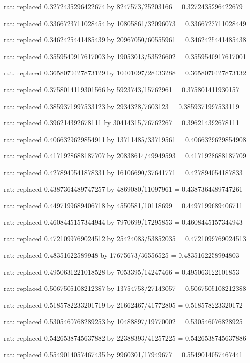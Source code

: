 \documentclass[a4paper,10pt]{article}
\begin{document}
\begin{eulernotebook}
\begin{eulercomment}
\begin{eulercomment}
\begin{eulercomment}
\begin{eulercomment}
\begin{eulercomment}
\begin{eulercomment}
\begin{eulercomment}
\begin{eulercomment}
\begin{eulercomment}
\begin{eulercomment}
\begin{eulercomment}
\begin{eulercomment}
\begin{eulercomment}
\begin{eulercomment}
\begin{eulercomment}
\begin{eulercomment}
\begin{euleroutput}
  rat: replaced 0.3272435296422674 by 8247573/25203166 = 0.3272435296422679
  
  rat: replaced 0.3366723711028454 by 10805861/32096073 = 0.3366723711028449
  
  rat: replaced 0.3462425441485439 by 20967050/60555961 = 0.3462425441485438
  
  rat: replaced 0.3559540917617003 by 19053013/53526602 = 0.3559540917617001
  
  rat: replaced 0.3658070427873129 by 10401097/28433288 = 0.3658070427873132
  
  rat: replaced 0.3758014119301566 by 5923743/15762961 = 0.375801411930157
  
  rat: replaced 0.3859371997533123 by 2934328/7603123 = 0.3859371997533119
  
  rat: replaced 0.396214392678111 by 30414315/76762267 = 0.396214392678111
  
  rat: replaced 0.4066329629854911 by 13711485/33719561 = 0.4066329629854908
  
  rat: replaced 0.4171928688187707 by 20838614/49949593 = 0.4171928688187709
  
  rat: replaced 0.4278940541878331 by 16106690/37641771 = 0.427894054187833
  
  rat: replaced 0.4387364489747257 by 4869080/11097961 = 0.4387364489747261
  
  rat: replaced 0.4497199689406718 by 4550581/10118699 = 0.4497199689406711
  
  rat: replaced 0.4608445157344944 by 7970699/17295853 = 0.4608445157344943
  
  rat: replaced 0.4721099769024512 by 25424083/53852035 = 0.4721099769024513
  
  rat: replaced 0.48351622589948 by 17675673/36556525 = 0.4835162258994803
  
  rat: replaced 0.4950631221018528 by 7053395/14247466 = 0.495063122101853
  
  rat: replaced 0.5067505108212387 by 13754758/27143057 = 0.5067505108212388
  
  rat: replaced 0.5185782233201719 by 21662467/41772805 = 0.518578223320172
  
  rat: replaced 0.5305460768289253 by 10488897/19770002 = 0.530546076828925
  
  rat: replaced 0.5426538745637882 by 22388393/41257225 = 0.5426538745637886
  
  rat: replaced 0.5549014057467435 by 9960301/17949677 = 0.5549014057467441
  

\end{euleroutput}
\end{eulercomment}
\end{eulercomment}
\end{eulercomment}
\end{eulercomment}
\end{eulercomment}
\end{eulercomment}
\end{eulercomment}
\end{eulercomment}
\end{eulercomment}
\end{eulercomment}
\end{eulercomment}
\end{eulercomment}
\end{eulercomment}
\end{eulercomment}
\end{eulercomment}
\end{eulercomment}
\end{eulernotebook}
\end{document}
